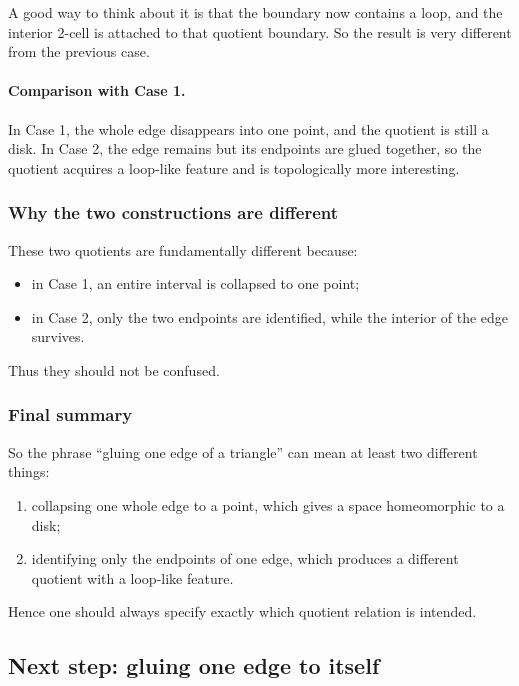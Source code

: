 \documentclass[12pt,a4paper]{article}
\theoremstyle{notespace}
\begin{document}
A good way to think about it is that the boundary now contains a loop, and the interior 2-cell is attached to that quotient boundary. So the result is very different from the previous case.

\paragraph{Comparison with Case 1.}
In Case 1, the whole edge disappears into one point, and the quotient is still a disk. In Case 2, the edge remains but its endpoints are glued together, so the quotient acquires a loop-like feature and is topologically more interesting.

\subsubsection{Why the two constructions are different}

These two quotients are fundamentally different because:

\begin{itemize}
	\item in Case 1, an entire interval is collapsed to one point;
	\item in Case 2, only the two endpoints are identified, while the interior of the edge survives.
\end{itemize}

Thus they should not be confused.

\subsubsection{Final summary}

So the phrase ``gluing one edge of a triangle'' can mean at least two different things:

\begin{enumerate}
	\item collapsing one whole edge to a point, which gives a space homeomorphic to a disk;
	\item identifying only the endpoints of one edge, which produces a different quotient with a loop-like feature.
\end{enumerate}

Hence one should always specify exactly which quotient relation is intended.
	
	
\subsection{Next step: gluing one edge to itself}
\end{document}
